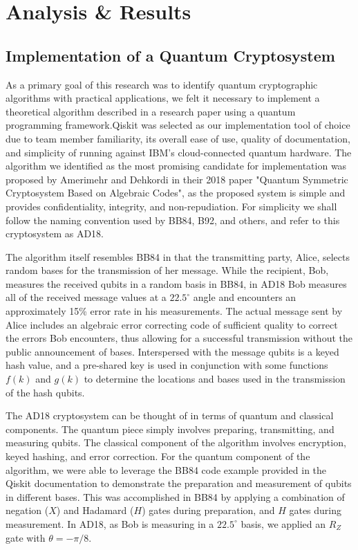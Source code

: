 \documentclass[sigconf]{acmart}
\begin{document}
\section{Analysis \& Results}
\subsection{Implementation of a Quantum Cryptosystem}\label{sec:implementation}
As a primary goal of this research was to identify quantum cryptographic algorithms with practical applications, we felt it necessary to implement a theoretical algorithm described in a research paper using a quantum programming framework.Qiskit was selected as our implementation tool of choice due to team member familiarity, its overall ease of use, quality of documentation, and simplicity of running against IBM's cloud-connected quantum hardware. The algorithm we identified as the most promising candidate for implementation was proposed by Amerimehr and Dehkordi in their 2018 paper "Quantum Symmetric Cryptosystem Based on Algebraic Codes"\cite{amerimehr_quantum_2018}, as the proposed system is simple and provides confidentiality, integrity, and non-repudiation. For simplicity we shall follow the naming convention used by BB84, B92, and others, and refer to this cryptosystem as AD18. 

The algorithm itself resembles BB84 in that the transmitting party, Alice, selects random bases for the transmission of her message. While the recipient, Bob, measures the received qubits in a random basis in BB84, in AD18 Bob measures all of the received message values at a $22.5^{\circ}$ angle and encounters an approximately 15\% error rate in his measurements. The actual message sent by Alice includes an algebraic error correcting code of sufficient quality to correct the errors Bob encounters, thus allowing for a successful transmission without the public announcement of bases. Interspersed with the message qubits is a keyed hash value, and a pre-shared key is used in conjunction with some functions $f(k)$ and $g(k)$ to determine the locations and bases used in the transmission of the hash qubits.

The AD18 cryptosystem can be thought of in terms of quantum and classical components. The quantum piece simply involves preparing, transmitting, and measuring qubits. The classical component of the algorithm involves encryption, keyed hashing, and error correction. For the quantum component of the algorithm, we were able to leverage the BB84 code example provided in the Qiskit documentation\cite{noauthor_quantum_nodate} to demonstrate the preparation and measurement of qubits in different bases. This was accomplished in BB84 by applying a combination of negation ($X$) and Hadamard ($H$) gates during preparation, and $H$ gates during measurement. In AD18, as Bob is measuring in a $22.5^{\circ}$ basis, we applied an $R_Z$ gate with $\theta = -\pi/8$.
\end{document}
